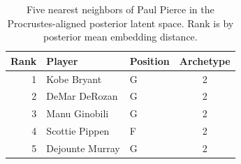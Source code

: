 \begin{table}[htbp]
  \centering\small
  \begin{tabular}{rllc}
    \toprule
    Rank & Player & Position & Archetype \\
    \midrule
    1 & Kobe Bryant & G & 2 \\
    2 & DeMar DeRozan & G & 2 \\
    3 & Manu Ginobili & G & 2 \\
    4 & Scottie Pippen & F & 2 \\
    5 & Dejounte Murray & G & 2 \\
    \bottomrule
  \end{tabular}
  \caption{Five nearest neighbors of Paul Pierce in the Procrustes-aligned posterior latent space. Rank is by posterior mean embedding distance.}
  \label{tab:Paul_Pierce_neighbors}
\end{table}

